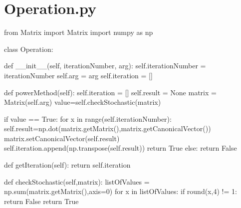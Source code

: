 \documentclass[12pt,a4paper]{article}
\begin{document}
\section{Operation.py}

\begin{python}
from Matrix import Matrix
import numpy as np 

class Operation:

	def __init__(self, iterationNumber, arg):
		self.iterationNumber = iterationNumber
		self.arg = arg
		self.iteration = []
	
	def powerMethod(self):
		self.iteration = []
		self.result = None
		matrix = Matrix(self.arg)
		value=self.checkStochastic(matrix)
	
		if value == True:
			for x in range(self.iterationNumber):
				self.result=np.dot(matrix.getMatrix(),matrix.getCanonicalVector())
				matrix.setCanonicalVector(self.result)
				self.iteration.append(np.transpose(self.result))
			return True
		else:
			return False
	
	def getIteration(self):
		return self.iteration
	
	def checkStochastic(self,matrix):
		listOfValues = np.sum(matrix.getMatrix(),axis=0)
		for x in listOfValues:
			if round(x,4) != 1:
				return False
		return True
	
\end{python}
\end{document}
